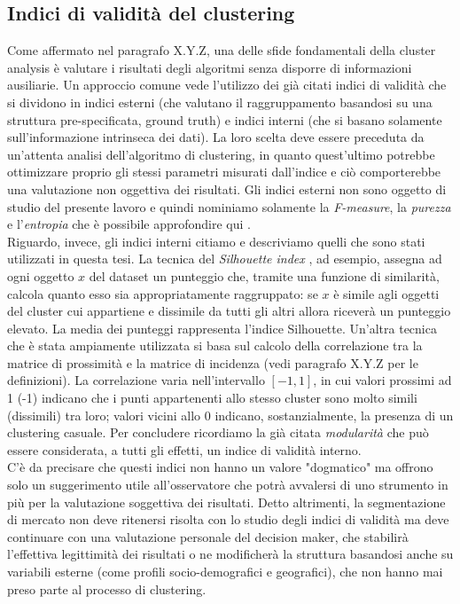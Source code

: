 \subsection{Indici di validit\`a del clustering}
Come affermato nel paragrafo X.Y.Z, una delle sfide fondamentali della cluster analysis \`e valutare i risultati degli algoritmi senza disporre di informazioni ausiliarie. Un approccio comune vede l'utilizzo dei gi\`a citati indici di validit\`a che si dividono in indici esterni (che valutano il raggruppamento basandosi su una struttura pre-specificata, ground truth) e indici interni (che si basano solamente sull'informazione intrinseca dei dati). La loro scelta deve essere preceduta da un'attenta analisi dell'algoritmo di clustering, in quanto quest'ultimo potrebbe ottimizzare proprio gli stessi parametri misurati dall'indice e ci\`o comporterebbe una valutazione non oggettiva dei risultati. Gli indici esterni non sono oggetto di studio del presente lavoro e quindi nominiamo solamente la \textit{F-measure}, la \textit{purezza} e l'\textit{entropia} che \`e possibile approfondire qui \cite{rendon2011}. \\
Riguardo, invece, gli indici interni citiamo e descriviamo quelli che sono stati utilizzati in questa tesi. La tecnica del \textit{Silhouette index} \cite{Rousseeuw1987}, ad esempio, assegna ad ogni oggetto $ x $ del dataset un punteggio che, tramite una funzione di similarit\`a, calcola quanto esso sia appropriatamente raggruppato: se $ x $ \`e simile agli oggetti del cluster cui appartiene e dissimile da tutti gli altri allora ricever\`a un punteggio elevato. La media dei punteggi rappresenta l'indice Silhouette.
Un'altra tecnica che \`e stata ampiamente utilizzata si basa sul calcolo della correlazione tra la matrice di prossimit\`a e la matrice di incidenza (vedi paragrafo X.Y.Z per le definizioni). La correlazione varia nell'intervallo $ [-1, 1] $, in cui valori prossimi ad 1 (-1) indicano che i punti appartenenti allo stesso cluster sono molto simili (dissimili) tra loro; valori vicini allo 0 indicano, sostanzialmente, la presenza di un clustering casuale. Per concludere ricordiamo la gi\`a citata \textit{modularit\`a} che pu\`o essere considerata, a tutti gli effetti, un indice di validit\`a interno.\\
C'\`e da precisare che questi indici non hanno un valore "dogmatico" ma offrono solo un suggerimento utile all'osservatore che potr\`a avvalersi di uno strumento in pi\`u per la valutazione soggettiva dei risultati. Detto altrimenti, la segmentazione di mercato non deve ritenersi risolta con lo studio degli indici di validit\`a ma deve continuare con una valutazione personale del decision maker, che stabilir\`a l'effettiva legittimit\`a dei risultati o ne modificher\`a la struttura basandosi anche su variabili esterne (come profili socio-demografici e geografici), che non hanno mai preso parte al processo di clustering.

